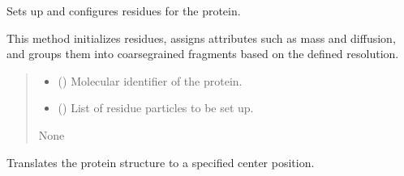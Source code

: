 \documentclass[letterpaper,10pt,english]{sphinxmanual}
\begin{document}
\begin{fulllineitems}

\begin{fulllineitems}
\label{\detokenize{src:src.Protein_Class.ProteinStructure.setup_residues}}
\pysigstartsignatures
{}
\pysigstopsignatures
\sphinxAtStartPar
Sets up and configures residues for the protein.

\sphinxAtStartPar
This method initializes residues, assigns attributes such as mass and diffusion,
and groups them into coarse\sphinxhyphen{}grained fragments based on the defined resolution.
\begin{quote}\begin{description}
\begin{itemize}
\item {} 
\sphinxAtStartPar
{} () \textendash{} Molecular identifier of the protein.

\item {} 
\sphinxAtStartPar
{} () \textendash{} List of residue particles to be set up.

\end{itemize}

\sphinxAtStartPar
None

\end{description}\end{quote}

\end{fulllineitems}


\begin{fulllineitems}
\label{\detokenize{src:src.Protein_Class.ProteinStructure.translate_protein_to_center}}
\pysigstartsignatures
{}
\pysigstopsignatures
\sphinxAtStartPar
Translates the protein structure to a specified center position.


\end{fulllineitems}
\end{fulllineitems}
\end{document}

